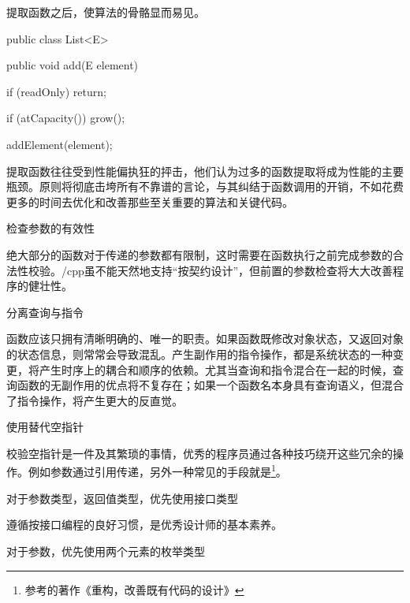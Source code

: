 \begin{content}
提取函数之后，使算法的骨骼显而易见。

\begin{leftbar}
\begin{java}
public class List<E> {
   public void add(E element) {
      if (readOnly)
         return;
      
      if (atCapacity())
         grow();
      
      addElement(element);
   }
}
\end{java}
\end{leftbar}

提取函数往往受到性能偏执狂的抨击，他们认为过多的函数提取将成为性能的主要瓶颈。原则将彻底击垮所有不靠谱的言论，与其纠结于函数调用的开销，不如花费更多的时间去优化和改善那些至关重要的算法和关键代码。

\begin{regulation}
检查参数的有效性
\end{regulation}

绝大部分的函数对于传递的参数都有限制，这时需要在函数执行之前完成参数的合法性校验。\clang{}/cpp{}虽不能天然地支持“按契约设计”，但前置的参数检查将大大改善程序的健壮性。

\begin{regulation}
分离查询与指令
\end{regulation}

函数应该只拥有清晰明确的、唯一的职责。如果函数既修改对象状态，又返回对象的状态信息，则常常会导致混乱。产生副作用的指令操作，都是系统状态的一种变更，将产生时序上的耦合和顺序的依赖。尤其当查询和指令混合在一起的时候，查询函数的无副作用的优点将不复存在；如果一个函数名本身具有查询语义，但混合了指令操作，将产生更大的反直觉。

\begin{regulation}
使用替代空指针
\end{regulation}

校验空指针是一件及其繁琐的事情，优秀的程序员通过各种技巧绕开这些冗余的操作。例如参数通过引用传递，另外一种常见的手段就是\footnote{参考的著作《重构，改善既有代码的设计》}。

\begin{regulation}
对于参数类型，返回值类型，优先使用接口类型
\end{regulation}

遵循按接口编程的良好习惯，是优秀设计师的基本素养。

\begin{regulation}
对于参数，优先使用两个元素的枚举类型
\end{regulation}


\end{content}
